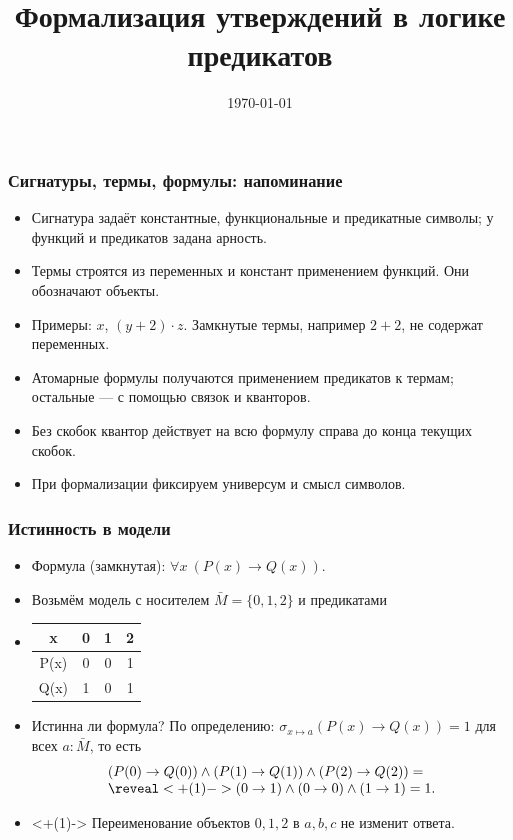 \documentclass[10pt]{beamer}
\title{Формализация утверждений в логике предикатов}
\date{\today}
\begin{document}
\begin{frame}[plain]
    \maketitle
\end{frame}

\begin{frame}
    \frametitle{Сигнатуры, термы, формулы: напоминание}
    \begin{itemize}
        \item Сигнатура задаёт константные, функциональные и предикатные символы; у функций и предикатов задана арность.
        \item Термы строятся из переменных и констант применением функций. Они обозначают объекты.
        \item Примеры: $x$, $(y+2)\cdot z$. Замкнутые термы, например $2+2$, не содержат переменных.
        \pause
        \item Атомарные формулы получаются применением предикатов к термам; остальные --- с помощью связок и кванторов.
        \item Без скобок квантор действует на всю формулу справа до конца текущих скобок.
        \item При формализации фиксируем универсум и смысл символов.
    \end{itemize}
\end{frame}

\begin{frame}
    \frametitle{Истинность в модели}
    \begin{itemize}
        \item Формула (замкнутая): $\forall x ~ (P(x) \to Q(x))$.
        \item Возьмём модель с носителем $\bar{M} = \{0,1,2\}$ и предикатами \pause
        \item[] \begin{tabular}{c | c c c}
            x & 0 & 1 & 2 \\ \hline
            P(x) & 0 & 0 & 1 \\
            Q(x) & 1 & 0 & 1
        \end{tabular}
        \item Истинна ли формула? \pause По определению: $\sigma_{x \mapsto a}(P(x) \to Q(x)) = 1$ для всех $a : \bar{M}$, то есть
        \[ \begin{array}{l}
            (P(0) \to Q(0)) \land (P(1) \to Q(1)) \land (P(2) \to Q(2)) = \\
            \reveal<+(1)->{(0 \to 1) \land (0 \to 0) \land (1 \to 1) = 1.}
        \end{array} \]
        \item<+(1)-> Переименование объектов $0,1,2$ в $a,b,c$ не изменит ответа.
    \end{itemize}
\end{frame}
\end{document}
